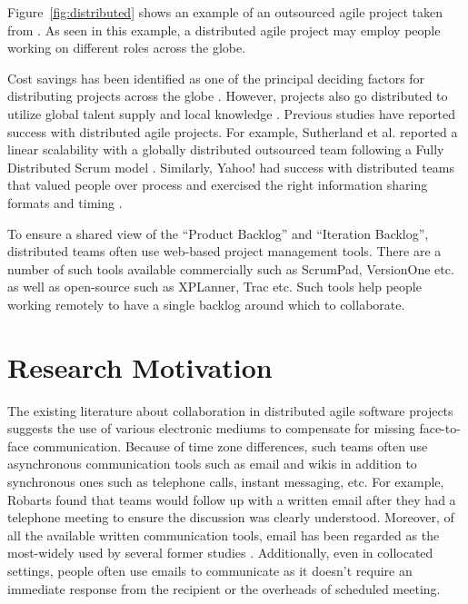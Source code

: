 Figure~\ref{fig:distributed} shows an example of an outsourced agile project taken from \cite{modified_agile}. As seen in this example, a distributed agile project may employ people working on different roles across the globe.

Cost savings has been identified as one of the principal deciding factors for distributing projects across the globe \cite{practical_considerations}. However, projects also go distributed to utilize global talent supply and local knowledge \cite{fully_distributed, modified_agile}. Previous studies have reported success with distributed agile projects. For example, Sutherland et al. reported a linear scalability with a globally distributed outsourced team following a Fully Distributed Scrum model \cite{fully_distributed}. Similarly, Yahoo! had success with distributed teams that valued people over process and exercised the right information sharing formats and timing \cite{yahoo}.

To ensure a shared view of the ``Product Backlog'' and ``Iteration Backlog'', distributed teams often use web-based project management tools. There are a number of such tools available commercially such as ScrumPad, VersionOne etc. as well as open-source \cite{scrum_pad, version_one} such as XPLanner, Trac etc.\cite{xplanner, trac} Such tools help people working remotely to have a single backlog around which to collaborate. 

\section{Research Motivation}
The existing literature about collaboration in distributed agile software projects suggests the use of various electronic mediums to compensate for missing face-to-face communication. Because of time zone differences, such teams often use asynchronous communication tools such as email and wikis in addition to synchronous ones such as telephone calls, instant messaging, etc. For example, Robarts \cite{practical_considerations} found that teams would follow up with a written email after they had a telephone meeting to ensure the discussion was clearly understood. Moreover, of all the available written communication tools, email has been regarded as the most-widely used by several former studies \cite{collaboration_in, on_coord}. Additionally, even in collocated settings, people often use emails to communicate as it doesn't require an immediate response from the recipient or the overheads of scheduled meeting.

